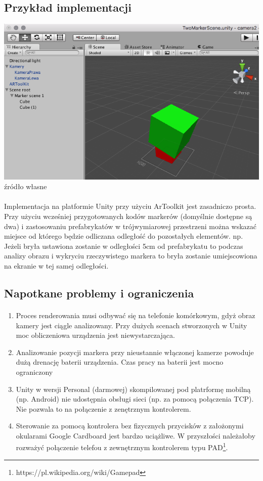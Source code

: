 \subsection{Przykład implementacji}
\begin{center}
\includegraphics[width=1\textwidth]{images/artoolkit-przyklad.png}
\small {źródło własne}
\end{center}
\paragraph{}
Implementacja na platformie Unity przy użyciu ArToolkit jest zasadniczo prosta. Przy użyciu wcześniej przygotowanych kodów markerów (domyślnie dostępne są dwa) i zastosowaniu prefabrykatów w trójwymiarowej przestrzeni można wskazać miejsce od którego będzie odliczana odległość do pozostałych elementów. np. Jeżeli bryła ustawiona zostanie w odległości 5cm od prefabrykatu to podczas analizy obrazu i wykryciu rzeczywistego markera to bryła zostanie umiejscowiona na ekranie w tej samej odległości.
\subsection{Napotkane problemy i ograniczenia}
\paragraph{}
\begin{enumerate}
	\item Proces renderowania musi odbywać się na telefonie komórkowym, gdyż obraz kamery jest ciągle analizowany. Przy dużych scenach stworzonych w Unity moc obliczeniowa urządzenia jest niewystarczająca.
	\item Analizowanie pozycji markera przy nieustannie włączonej kamerze powoduje dużą drenację baterii urządzenia. Czas pracy na baterii jest mocno ograniczony
	\item Unity w wersji Personal (darmowej) skompilowanej pod platrformę mobilną (np. Android) nie udostępnia obsługi sieci (np. za pomocą połączenia TCP). Nie pozwala to na połączenie z zenętrznym kontrolerem.
	\item Sterowanie za pomocą kontrolera bez fizycznych przycisków z założonymi okularami Google Cardboard jest bardzo uciążliwe. W przyszłości należałoby rozważyć połączenie telefou z zewnętrznym kontrolerem typu PAD\footnote{https://pl.wikipedia.org/wiki/Gamepad}.
\end{enumerate}